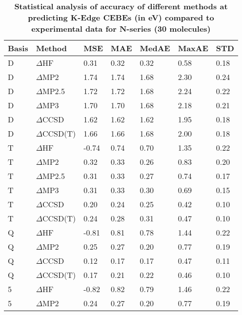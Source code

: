 \begin{table}
  \caption{\textbf{Statistical analysis of accuracy of different methods at predicting K-Edge CEBEs (in eV) compared to experimental data for N-series (30 molecules)}}
  \label{tbl:method-summary-n}
  \begin{tabular}{l l l l l l l }
    \hline
    \textbf{Basis} & \textbf{Method} & \textbf{MSE} & \textbf{MAE} & \textbf{MedAE} & \textbf{MaxAE} & \textbf{STD} \\ 
    \hline
    D & $\Delta$HF & 0.31 & 0.32 & 0.32 & 0.58 & 0.18 \\ 
    D & $\Delta$MP2 & 1.74 & 1.74 & 1.68 & 2.30 & 0.24 \\ 
    D & $\Delta$MP2.5 & 1.72 & 1.72 & 1.68 & 2.24 & 0.22 \\ 
    D & $\Delta$MP3 & 1.70 & 1.70 & 1.68 & 2.18 & 0.21 \\ 
    D & $\Delta$CCSD & 1.62 & 1.62 & 1.62 & 1.95 & 0.18 \\ 
    D & $\Delta$CCSD(T) & 1.66 & 1.66 & 1.68 & 2.00 & 0.18 \\ 
    T & $\Delta$HF & -0.74 & 0.74 & 0.70 & 1.35 & 0.22 \\ 
    T & $\Delta$MP2 & 0.32 & 0.33 & 0.26 & 0.83 & 0.20 \\ 
    T & $\Delta$MP2.5 & 0.31 & 0.33 & 0.27 & 0.74 & 0.17 \\ 
    T & $\Delta$MP3 & 0.31 & 0.33 & 0.30 & 0.69 & 0.15 \\ 
    T & $\Delta$CCSD & 0.20 & 0.24 & 0.25 & 0.42 & 0.10 \\ 
    T & $\Delta$CCSD(T) & 0.24 & 0.28 & 0.31 & 0.47 & 0.10 \\ 
    Q & $\Delta$HF & -0.81 & 0.81 & 0.78 & 1.44 & 0.22 \\ 
    Q & $\Delta$MP2 & 0.25 & 0.27 & 0.20 & 0.77 & 0.19 \\ 
    Q & $\Delta$CCSD & 0.12 & 0.17 & 0.17 & 0.47 & 0.11 \\ 
    Q & $\Delta$CCSD(T) & 0.17 & 0.21 & 0.22 & 0.46 & 0.10 \\ 
    5 & $\Delta$HF & -0.82 & 0.82 & 0.79 & 1.46 & 0.22 \\ 
    5 & $\Delta$MP2 & 0.24 & 0.27 & 0.20 & 0.77 & 0.19 \\ 
    \hline
  \end{tabular}
\end{table}
